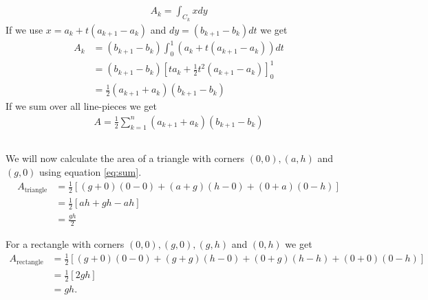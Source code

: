 \documentclass[a4paper,10pt,english]{article}
\begin{document}
\subsection{} \label{1c}
\begin{align}
    A_k = \int_{C_k} x dy
\end{align}
If we use $x = a_k + t (a_{k+1} - a_k)$ and $dy = ( b_{k+1} - b_k) dt$ we get
\begin{align*}
    A_k &= (b_{k+1} - b_k) \int_0^1 (a_k + t (a_{k+1} - a_k)) dt \\
    &= (b_{k+1} - b_k) \left[ ta_k + \frac{1}{2} t^2 (a_{k+1} - a_k) \right]_0^1 \\
    &= \frac{1}{2} (a_{k+1} + a_k)(b_{k+1} - b_k)
\end{align*}
If we sum over all line-pieces we get
\begin{align} \label{eq:sum}
    A = \frac{1}{2} \sum_{k=1}^{n} (a_{k+1} + a_k)(b_{k+1} - b_k) 
\end{align}

\subsection{} \label{1d}
We will now calculate the area of a triangle with corners $(0, 0), (a, h)$ and $(g, 0)$ using equation \ref{eq:sum}.
\begin{align*}
    A_{\text{triangle}} &= \frac{1}{2} [(g+0)(0-0) + (a+g)(h-0) + (0+a)(0-h)] \\
    &= \frac{1}{2} [ah + gh - ah] \\
    &= \frac{gh}{2}
\end{align*}

For a rectangle with corners $(0, 0), (g, 0), (g, h)$ and $(0, h)$ we get
\begin{align*}
    A_{\text{rectangle}} &= \frac{1}{2} [(g+0)(0-0) + (g+g)(h-0) + (0+g)(h-h) + (0+0)(0-h)] \\
    &= \frac{1}{2} [2gh] \\
    &= gh.
\end{align*}

\newpage

\section{} \label{2}
\end{document}
